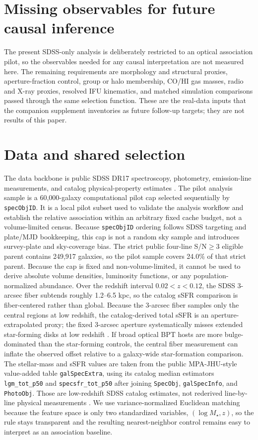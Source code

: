 \documentclass[twocolumn]{aastex631}
\begin{document}
\section{Missing observables for future causal inference}
The present SDSS-only analysis is deliberately restricted to an optical association pilot, so the observables needed for any causal interpretation are not measured here. The remaining requirements are morphology and structural proxies, aperture-fraction control, group or halo membership, CO/HI gas masses, radio and X-ray proxies, resolved IFU kinematics, and matched simulation comparisons passed through the same selection function. These are the real-data inputs that the companion supplement inventories as future follow-up targets; they are not results of this paper.

\section{Data and shared selection}
The data backbone is public SDSS DR17 spectroscopy, photometry, emission-line measurements, and catalog physical-property estimates \citep{york2000,sdssdr17,brinchmann2004}. The pilot analysis sample is a 60,000-galaxy computational pilot cap selected sequentially by \texttt{specObjID}. It is a local pilot subset used to validate the analysis workflow and establish the relative association within an arbitrary fixed cache budget, not a volume-limited census. Because \texttt{specObjID} ordering follows SDSS targeting and plate/MJD bookkeeping, this cap is not a random sky sample and introduces survey-plate and sky-coverage bias. The strict public four-line S/N$\geq3$ eligible parent contains 249,917 galaxies, so the pilot sample covers 24.0\% of that strict parent. Because the cap is fixed and non-volume-limited, it cannot be used to derive absolute volume densities, luminosity functions, or any population-normalized abundance.
Over the redshift interval $0.02<z<0.12$, the SDSS 3-arcsec fiber subtends roughly 1.2--6.5 kpc, so the catalog sSFR comparison is fiber-centered rather than global.
Because the 3-arcsec fiber samples only the central regions at low redshift, the catalog-derived total sSFR is an aperture-extrapolated proxy; the fixed 3-arcsec aperture systematically misses extended star-forming disks at low redshift \citep{kewley2005}. If broad optical BPT hosts are more bulge-dominated than the star-forming controls, the central fiber measurement can inflate the observed offset relative to a galaxy-wide star-formation comparison.
The stellar-mass and sSFR values are taken from the public MPA-JHU-style value-added table \texttt{galSpecExtra}, using its catalog median estimators \texttt{lgm\_tot\_p50} and \texttt{specsfr\_tot\_p50} after joining \texttt{SpecObj}, \texttt{galSpecInfo}, and \texttt{PhotoObj}. Those are low-redshift SDSS catalog estimates, not rederived line-by-line physical measurements \citep{brinchmann2004,sdssdr17,york2000}. We use variance-normalized Euclidean matching because the feature space is only two standardized variables, $(\log M_\star,z)$, so the rule stays transparent and the resulting nearest-neighbor control remains easy to interpret as an association baseline.
\end{document}
